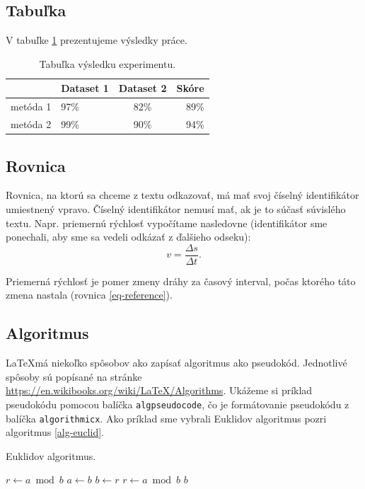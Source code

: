 \subsection*{Tabuľka}
V tabuľke \ref{tab-results} prezentujeme výsledky práce.
\begin{table}[H]
	\begin{center}
		\begin{tabular}{|c|l|c|r|}
			\hline
			& Dataset 1 & Dataset 2 & Skóre \\
			\hline
			metóda 1 & 97\% & 82\% & 89\% \\
			\hline
			metóda 2 & 99\% & 90\% & 94\% \\
			\hline
		\end{tabular}
	\end{center}
	\caption{Tabuľka výsledku experimentu.}
	\label{tab-results}
\end{table}


\subsection*{Rovnica}
Rovnica, na ktorú sa chceme z textu odkazovať, má mať svoj číselný identifikátor umiestnený vpravo. Číselný identifikátor nemusí mať, ak je to súčasť súvislého textu. Napr. priemernú rýchlosť vypočítame nasledovne (identifikátor sme ponechali, aby sme sa vedeli odkázať z ďalšieho odseku):
\begin{equation} \label{eq-reference}
	v = \frac{\Delta s}{\Delta t}.
\end{equation}

Priemerná rýchlosť je pomer zmeny dráhy za časový interval, počas ktorého táto zmena nastala (rovnica \ref{eq-reference}).

\subsection*{Algoritmus}
\LaTeX \space má niekoľko spôsobov ako zapísať algoritmus ako pseudokód. Jednotlivé spôsoby sú popísané na stránke \url{https://en.wikibooks.org/wiki/LaTeX/Algorithms}. Ukážeme si príklad pseudokódu pomocou balíčka \texttt{algpseudocode}, čo je formátovanie pseudokódu z balíčka \texttt{algorithmicx}. Ako príklad sme vybrali Euklidov algoritmus pozri algoritmus \ref{alg-euclid}.

\begin{algorithm}[H]
	\caption{Euklidov algoritmus.}\label{alg-euclid}
	\begin{algorithmic}[1]
		\State $r\gets a\bmod b$
		\State $a\gets b$
		\State $b\gets r$
		\State $r\gets a\bmod b$
		\EndWhile\label{euclidendwhile}
		\State \Return $b$
		\EndProcedure
	\end{algorithmic}
\end{algorithm}


